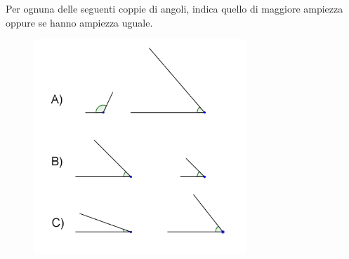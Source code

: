 \item Per ognuna delle seguenti coppie di angoli, indica quello di maggiore ampiezza oppure se hanno ampiezza uguale.
\begin{figure}[h]
	\centering
		\includegraphics[width=8cm]{figure/ampiezza_angoli_TI.png}
\end{figure}